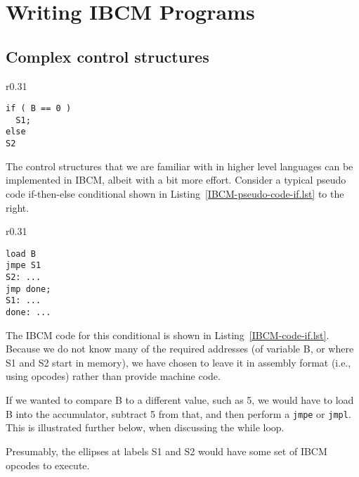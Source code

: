 \section{Writing IBCM Programs}

\subsection{Complex control structures}

\begin{wrapfigure}{r}{0.31\textwidth}
\vspace{-0.1in}
\begin{lstlisting}[caption={\bf if} pseudo code,backgroundcolor=\color{white},frame=trBL,linewidth=2in,xleftmargin=0.25in,label={IBCM-pseudo-code-if.lst}]
if ( B == 0 )
  S1;
else
S2
\end{lstlisting}
\vspace{0.25in}
\end{wrapfigure}

The control structures that we are familiar with in higher level
languages can be implemented in IBCM, albeit with a bit more effort.
Consider a typical pseudo code if-then-else conditional shown in
Listing~\ref{IBCM-pseudo-code-if.lst} to the right.

\begin{wrapfigure}{r}{0.31\textwidth}
\vspace{-0.4in}
\begin{lstlisting}[backgroundcolor=\color{white},frame=trBL,linewidth=2in,xleftmargin=0.25in,label={IBCM-code-if.lst},caption={IBCM {\bf if} code}]
load B
jmpe S1
S2: ...
jmp done;
S1: ...
done: ...
\end{lstlisting}
\vspace{-0.25in}
\end{wrapfigure}

The IBCM code for this conditional is shown in
Listing~\ref{IBCM-code-if.lst}.  Because we do not know many of the
required addresses (of variable B, or where S1 and S2 start in
memory), we have chosen to leave it in assembly format (i.e., using
opcodes) rather than provide machine code.

If we wanted to compare B to a different value, such as 5, we would
have to load B into the accumulator, subtract 5 from that, and then
perform a {\tt jmpe} or {\tt jmpl}.  This is illustrated further
below, when discussing the while loop.

Presumably, the ellipses at labels S1 and S2 would have some set of
IBCM opcodes to execute.

